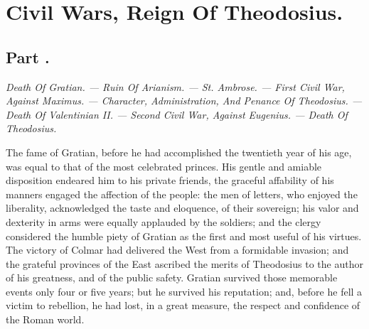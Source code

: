 \chapter{Civil Wars, Reign Of Theodosius.}
\section{Part \thesection.}

\textit{Death Of Gratian. — Ruin Of Arianism. — St. Ambrose. — First Civil War,
Against Maximus. — Character, Administration, And Penance Of
Theodosius. — Death Of Valentinian II. — Second Civil War, Against
Eugenius. — Death Of Theodosius.}

The fame of Gratian, before he had accomplished the twentieth
year of his age, was equal to that of the most celebrated
princes. His gentle and amiable disposition endeared him to his
private friends, the graceful affability of his manners engaged
the affection of the people: the men of letters, who enjoyed the
liberality, acknowledged the taste and eloquence, of their
sovereign; his valor and dexterity in arms were equally applauded
by the soldiers; and the clergy considered the humble piety of
Gratian as the first and most useful of his virtues. The victory
of Colmar had delivered the West from a formidable invasion; and
the grateful provinces of the East ascribed the merits of
Theodosius to the author of his greatness, and of the public
safety. Gratian survived those memorable events only four or five
years; but he survived his reputation; and, before he fell a
victim to rebellion, he had lost, in a great measure, the respect
and confidence of the Roman world.

